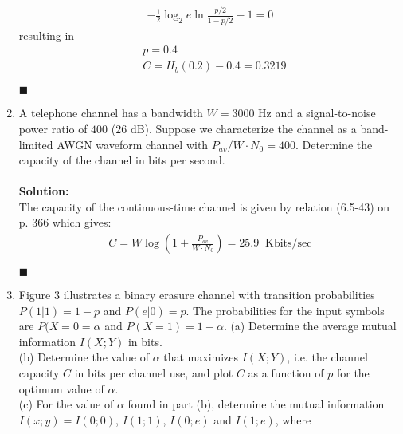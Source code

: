 \documentclass[a4paper,12pt]{article}
\begin{document}
\begin{enumerate}
            \begin{align*}
                -\frac{1}{2} \log_2 e \ln \frac{p/2}{1 - p/2} - 1 = 0
            \end{align*}
            resulting in 
            \begin{align*}
               & p = 0.4 \\ 
               & C = H_b(0.2) - 0.4 = 0.3219
            \end{align*}
            \begin{flushright}
                $\blacksquare$
            \end{flushright}
        \item
            A telephone channel has a bandwidth $W = 3000$ Hz and a signal-to-noise power ratio of $400$ ($26$ dB). Suppose we characterize the channel as a band-limited AWGN waveform channel with $P_{av}/W \cdot N_0 = 400$. Determine the capacity of the channel in bits per second. \\ \\ 
            \textbf{Solution:} \\
            The capacity of the continuous-time channel is given by relation (6.5-43) on p. 366 which gives: 
            \begin{align*}
                C = W \log \left( 1 + \frac{P_{av}}{W \cdot N_0} \right) = 25.9 \;\; \text{Kbits/sec}
            \end{align*}
            \begin{flushright}
                $\blacksquare$
            \end{flushright}
        \item 
            Figure 3 illustrates a binary erasure channel with transition probabilities $P(1|1) = 1 - p$ and $P(e|0) = p$. The probabilities for the input symbols are $P(X = 0 = \alpha$ and $P(X = 1) = 1 - \alpha$.
            (a) Determine the average mutual information $I(X;Y)$ in bits. \\ 
            (b) Determine the value of $\alpha$ that maximizes $I(X;Y)$, i.e. the channel capacity $C$ in bits per channel use, and plot $C$ as a function of $p$ for the optimum value of $\alpha$. \\
            (c) For the value of $\alpha$ found in part (b), determine the mutual information $I(x;y) = I(0;0)$, $I(1;1)$, $I(0;e)$ and $I(1;e)$, where 
            \begin{align*}

\end{align*}
\end{enumerate}
\end{document}
